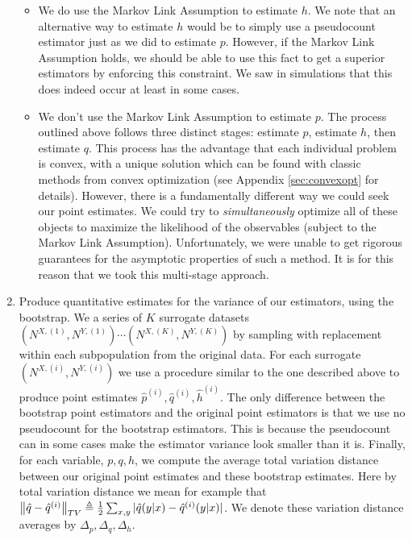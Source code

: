 \begin{enumerate}
\begin{itemize}
%
\item We do use the Markov Link Assumption to estimate $h$.  We note that an alternative way to estimate $h$ would be to simply use a pseudocount estimator just as we did to estimate $p$.  However, if the Markov Link Assumption holds, we should be able to use this fact to get a superior estimators by enforcing this constraint.  We saw in simulations that this does indeed occur at least in some cases.
%
\item We don't use the Markov Link Assumption to estimate $p$.  The process outlined above follows three distinct stages: estimate $p$, estimate $h$, then estimate $q$.  This process has the advantage that each individual problem is convex, with a unique solution which can be found with classic methods from convex optimization (see Appendix \ref{sec:convexopt} for details).  However, there is a fundamentally different way we could seek our point estimates.  We could try to \emph{simultaneously} optimize all of these objects to maximize the likelihood of the observables (subject to the Markov Link Assumption).  Unfortunately, we were unable to get rigorous guarantees for the asymptotic properties of such a method.  It is for this reason that we took this multi-stage approach.
\end{itemize}
%
\item Produce quantitative estimates for the variance of our estimators, using the bootstrap.  We a series of $K$ surrogate datasets $(N^{X,(1)},N^{Y,(1)})\cdots (N^{X,(K)},N^{Y,(K)})$ by sampling with replacement within each subpopulation from the original data.  For each surrogate $(N^{X,(i)},N^{Y,(i)})$ we use a procedure similar to the one described above to produce point estimates $\hat p^{(i)},\hat q^{(i)},\hat h^{(i)}$.  The only difference between the bootstrap point estimators and the original point estimators is that we use no pseudocount for the bootstrap estimators.  This is because the pseudocount can in some cases make the estimator variance look smaller than it is.  Finally, for each variable, $p,q,h$, we compute the average total variation distance between our original point estimates and these bootstrap estimates.    Here by total variation distance we mean for example that $\left\Vert \hat q- \hat q^{(i)}\right\Vert_{TV} \triangleq \frac{1}{2}\sum_{x,y}|\hat q(y|x)-\hat q^{(i)}(y|x)|$.  We denote these variation distance averages by $\Delta_p,\Delta_q,\Delta_h$.
%

\end{enumerate}
